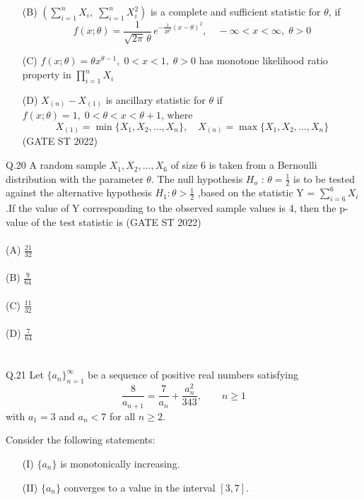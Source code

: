 \documentclass[journal,12pt,onecolumn]{IEEEtran}
\theoremstyle{remark}
\begin{document}
\begin{enumerate}
	\item[(B)] 
	$(\sum_{i=1}^n X_i,\; \sum_{i=1}^n X_i^2)$ is a complete and sufficient statistic for $\theta$, if 
	\[
	f(x; \theta) = \frac{1}{\sqrt{2 \pi}\,\theta}\,
	e^{-\frac{1}{2\theta^2}(x-\theta)^2},
	\quad -\infty < x < \infty,\; \theta > 0
	\]
	\item[(C)] 
	$f(x; \theta) = \theta x^{\theta - 1},\; 0 < x < 1,\; \theta > 0$
	has monotone likelihood ratio property in 
	$
	\prod_{i=1}^{n} X_i
	$
	\\
	\item[(D)] 
	$X_{(n)} - X_{(1)}$ is ancillary statistic for $\theta$ if 
	$f(x;\theta)=1,\; 0 < \theta < x < \theta+1$, where 
	\[
	X_{(1)} = \min\{X_1, X_2, \ldots, X_n\}, 
	\quad 
	X_{(n)} = \max\{X_1, X_2, \ldots, X_n\}
	\]
	\hfill (GATE ST 2022)
\end{enumerate}
Q.20 A random sample $X_1,X_2, \dots, X_6$ of size 6 is taken from a Bernoulli distribution with
the parameter $\theta$. The null hypothesis $H_o$ : $\theta = \frac{1}{2}$ is to be tested against the alternative hypothesis $H_1 : \theta > \frac{1}{2}$ ,based on the statistic Y = $\sum_{i=6}^{6}X_i$.If the value of Y
corresponding to the observed sample values is 4, then the p-value of the test
statistic is \hfill (GATE ST 2022)\\
\\
(A) $\frac{21}{32}$\\
\\
(B) $\frac{
9}{64}$\\
\\
(C) $\frac{11}{32}$\\
\\
(D) $\frac{7}{64}$\\
\\
\\
Q.21 Let $\{a_n\}_{n=1}^{\infty}$ be a sequence of positive real numbers satisfying 
\[
\frac{8}{a_{n+1}} = \frac{7}{a_n} + \frac{a_n^2}{343}, 
\qquad n \geq 1
\]
with $a_1 = 3$ and $a_n < 7$ for all $n \geq 2$. 

Consider the following statements:
\begin{enumerate}
	\item[(I)] $\{a_n\}$ is monotonically increasing.
	\item[(II)] $\{a_n\}$ converges to a value in the interval $[3,7]$.
\end{enumerate}
\end{document}
